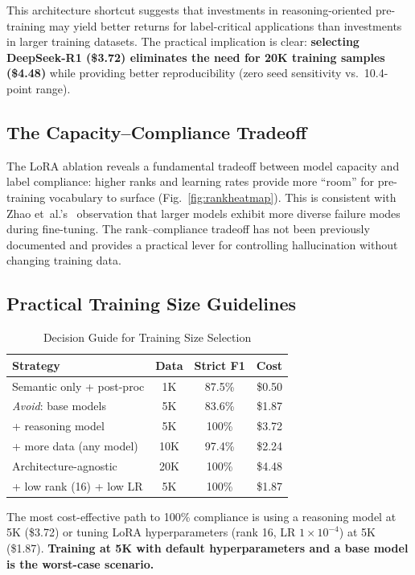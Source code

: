 \documentclass[review,3p]{elsarticle}
\begin{document}
This architecture shortcut suggests that investments in reasoning-oriented pre-training may yield better returns for label-critical applications than investments in larger training datasets. The practical implication is clear: \textbf{selecting DeepSeek-R1 (\$3.72) eliminates the need for 20K training samples (\$4.48)} while providing better reproducibility (zero seed sensitivity vs.\ 10.4-point range).

\subsection{The Capacity--Compliance Tradeoff}
The LoRA ablation reveals a fundamental tradeoff between model capacity and label compliance: higher ranks and learning rates provide more ``room'' for pre-training vocabulary to surface (Fig.~\ref{fig:rankheatmap}). This is consistent with Zhao et~al.'s~\cite{zhao2023} observation that larger models exhibit more diverse failure modes during fine-tuning. The rank--compliance tradeoff has not been previously documented and provides a practical lever for controlling hallucination without changing training data.

\subsection{Practical Training Size Guidelines}

\begin{table}[!ht]
\centering
\caption{Decision Guide for Training Size Selection}
\label{tab:recs}
\begin{tabular}{p{3cm}ccr}
\toprule
\textbf{Strategy} & \textbf{Data} & \textbf{Strict F1} & \textbf{Cost} \\
\midrule
Semantic only + post-proc & 1K & 87.5\% & \$0.50 \\
\textit{Avoid}: base models & 5K & 83.6\% & \$1.87 \\
+ reasoning model & 5K & 100\% & \$3.72 \\
+ more data (any model) & 10K & 97.4\% & \$2.24 \\
Architecture-agnostic & 20K & 100\% & \$4.48 \\
+ low rank (16) + low LR & 5K & 100\% & \$1.87 \\
\bottomrule
\end{tabular}
\end{table}

The most cost-effective path to 100\% compliance is using a reasoning model at 5K (\$3.72) or tuning LoRA hyperparameters (rank 16, LR $1 \times 10^{-4}$) at 5K (\$1.87). \textbf{Training at 5K with default hyperparameters and a base model is the worst-case scenario.}
\end{document}
